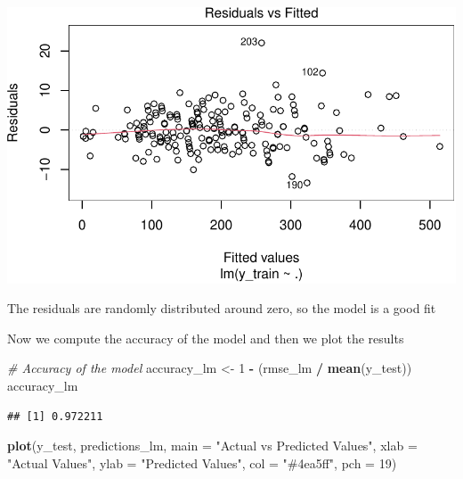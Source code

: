 \documentclass[
]{article}
\newenvironment{Shaded}{\begin{snugshade}}{\end{snugshade}}
\newcommand{\AttributeTok}[1]{\textcolor[rgb]{0.13,0.29,0.53}{#1}}
\newcommand{\CommentTok}[1]{\textcolor[rgb]{0.56,0.35,0.01}{\textit{#1}}}
\newcommand{\DecValTok}[1]{\textcolor[rgb]{0.00,0.00,0.81}{#1}}
\newcommand{\FunctionTok}[1]{\textcolor[rgb]{0.13,0.29,0.53}{\textbf{#1}}}
\newcommand{\NormalTok}[1]{#1}
\newcommand{\OtherTok}[1]{\textcolor[rgb]{0.56,0.35,0.01}{#1}}
\newcommand{\SpecialCharTok}[1]{\textcolor[rgb]{0.81,0.36,0.00}{\textbf{#1}}}
\newcommand{\StringTok}[1]{\textcolor[rgb]{0.31,0.60,0.02}{#1}}
\begin{document}
\begin{center}\includegraphics{Statistical_Learning_Final_Report_files/figure-latex/model_evaluation_lm-1} \end{center}

The residuals are randomly distributed around zero, so the model is a
good fit

Now we compute the accuracy of the model and then we plot the results

\begin{Shaded}
\begin{Highlighting}[]
\CommentTok{\# Accuracy of the model}
\NormalTok{accuracy\_lm }\OtherTok{\textless{}{-}} \DecValTok{1} \SpecialCharTok{{-}}\NormalTok{ (rmse\_lm }\SpecialCharTok{/} \FunctionTok{mean}\NormalTok{(y\_test))}
\NormalTok{accuracy\_lm}
\end{Highlighting}
\end{Shaded}

\begin{verbatim}
## [1] 0.972211
\end{verbatim}

\begin{Shaded}
\begin{Highlighting}[]
\FunctionTok{plot}\NormalTok{(y\_test, predictions\_lm, }\AttributeTok{main =} \StringTok{"Actual vs Predicted Values"}\NormalTok{,}
     \AttributeTok{xlab =} \StringTok{"Actual Values"}\NormalTok{, }\AttributeTok{ylab =} \StringTok{"Predicted Values"}\NormalTok{,}
     \AttributeTok{col =} \StringTok{"\#4ea5ff"}\NormalTok{, }\AttributeTok{pch =} \DecValTok{19}\NormalTok{)}
\end{Highlighting}
\end{Shaded}
\end{document}
